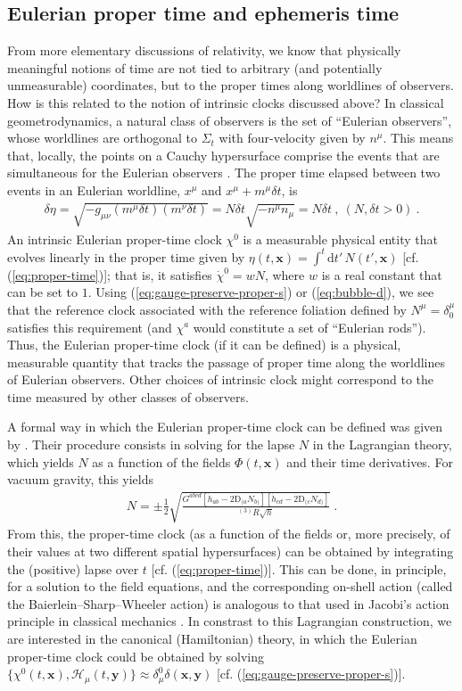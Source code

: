 \documentclass[12pt]{iopart}
\def\eq#1{\begin{equation}\begin{aligned}#1\end{aligned}\end{equation}}
\def\eref#1{(\ref{eq:#1})}
\def\D{\mathrm{d}}
\def\x{\mathbf{x}}
\def\y{\mathbf{y}}
\begin{document}
\subsection{\label{sec:clocks}Eulerian proper time and ephemeris time}
From more elementary discussions of relativity, we know that physically meaningful notions of time are not tied to arbitrary (and potentially unmeasurable) coordinates, but to the proper times along worldlines of observers. How is this related to the notion of intrinsic clocks discussed above? In classical geometrodynamics, a natural class of observers is the set of ``Eulerian observers'', whose worldlines are orthogonal to $\Sigma_t$ with four-velocity given by $n^{\mu}$. This means that, locally, the points on a Cauchy hypersurface comprise the events that are simultaneous for the Eulerian observers \citep{Gourgoulhon}. The proper time elapsed between two events in an Eulerian worldline, $x^{\mu}$ and $x^{\mu}+m^{\mu}\delta t$, is
\eq{\label{eq:proper-time}
\delta\eta = \sqrt{-g_{\mu\nu}(m^{\mu}\delta t)(m^{\nu}\delta t)} = N\delta t \sqrt{-n^{\mu}n_{\mu}} = N\delta t \ ,\ (N,\delta t > 0) \ .
}
An intrinsic Eulerian proper-time clock $\chi^0$ is a measurable physical entity that evolves linearly in the proper time given by $\eta(t,\x) = \int^t\D t'\, N(t',\x)$ [cf. \eref{proper-time}]; that is, it satisfies $\dot{\chi}^0 = w N$, where $w$ is a real constant that can be set to $1$. Using \eref{gauge-preserve-proper-s} or \eref{bubble-d}, we see that the reference clock associated with the reference foliation defined by $N^{\mu}=\delta^{\mu}_0$ satisfies this requirement (and $\chi^a$ would constitute a set of ``Eulerian rods''). Thus, the Eulerian proper-time clock (if it can be defined) is a physical, measurable quantity that tracks the passage of proper time along the worldlines of Eulerian observers. Other choices of intrinsic clock might correspond to the time measured by other classes of observers.

A formal way in which the Eulerian proper-time clock can be defined was given by \citet*{Baierlein:1962zz}. Their procedure consists in solving for the lapse $N$ in the Lagrangian theory, which yields $N$ as a function of the fields $\Phi(t,\x)$ and their time derivatives. For vacuum gravity, this yields
\eq{
N = \pm\frac12\sqrt{\frac{G^{abcd}[\dot{h}_{ab}-2\mathrm{D}_{(a}N_{b)}][\dot{h}_{cd}-2\mathrm{D}_{(c}N_{d)}]}{^{(3)}\!R\sqrt{h}}} \ .
}
From this, the proper-time clock (as a function of the fields or, more precisely, of their values at two different spatial hypersurfaces) can be obtained by integrating the (positive) lapse over $t$ [cf. \eref{proper-time}]. This can be done, in principle, for a solution to the field equations, and the corresponding on-shell action (called the Baierlein--Sharp--Wheeler action) is analogous to that used in Jacobi's action principle in classical mechanics \citep{Lanczos:book}. In constrast to this Lagrangian construction, we are interested in the canonical (Hamiltonian) theory, in which the Eulerian proper-time clock could be obtained by solving $\{\chi^0(t,\x),\mathcal{H}_{\mu}(t,\y)\}\approx\delta^0_{\mu}\delta(\x,\y)$ [cf. \eref{gauge-preserve-proper-s}].
\end{document}
